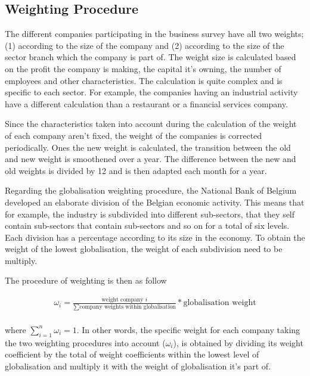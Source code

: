 \documentclass[12pt,a4paper,oneside]{book}
\begin{document}
\subsection{Weighting Procedure}
\label{sec:Weighting procedure}

The different companies participating in the business survey have all two weights; (1) according to the size of the company and (2) according to the size of the sector branch which the company is part of.
The weight size is calculated based on the profit the company is making, the capital it's owning, the number of employees and other characteristics. 
The calculation is quite complex and is specific to each sector. 
For example, the companies having an industrial activity have a different calculation than a restaurant or a financial services company.

Since the characteristics taken into account during the calculation of the weight of each company aren't fixed, the weight of the companies is corrected periodically. 
Ones the new weight is calculated, the transition between the old and new weight is smoothened over a year. The difference between the new and old weights is divided by 12 and is then adapted each month for a year.

Regarding the globalisation weighting procedure, the National Bank of Belgium developed an elaborate division of the Belgian economic activity. This means that for example, the industry is subdivided into different sub-sectors, that they self contain sub-sectors that contain sub-sectors and so on for a total of six levels. 
Each division has a percentage according to its size in the economy.
To obtain the weight of the lowest globalisation, the weight of each subdivision need to be multiply. 

The procedure of weighting is then as follow

\begin{eqnarray}
    \omega_i = \frac{ \text{weight company $i$} }{ \sum\text{company weights within globalisation} } * \text{globalisation weight} \\ \nonumber
\end{eqnarray}

where $\sum_{i=1}^{n} \omega_i = 1 $. In other words, the specific weight for each company taking the two weighting procedures into account ($\omega_i$), is obtained by dividing its weight coefficient by the total of weight coefficients within the lowest level of globalisation and multiply it with the weight of globalisation it's part of. 
\end{document}
